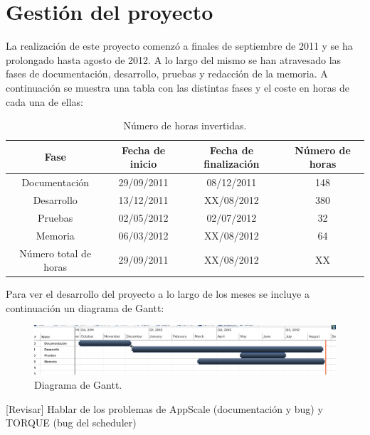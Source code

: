 \chapter{Gestión del proyecto}
\label{anx:gestion}


La realización de este proyecto comenzó a finales de septiembre de 2011 y se ha prolongado hasta agosto de 2012. A lo largo del mismo se han atravesado las fases de documentación, desarrollo, pruebas y redacción de la memoria. A continuación se muestra una tabla con las distintas fases y el coste en horas de cada una de ellas:

\begin{table}[!htbp]
\centering
   \begin{tabular}{|c|c|c|c|}
      \hline
      \textbf{Fase} & \textbf{Fecha de inicio} & \textbf{Fecha de finalización} & \textbf{Número de horas} \\ \hline
      Documentación & 29/09/2011 & 08/12/2011 & 148 \\ \hline
      Desarrollo & 13/12/2011 & XX/08/2012 & 380 \\ \hline
      Pruebas & 02/05/2012 & 02/07/2012 & 32 \\ \hline
      Memoria & 06/03/2012 & XX/08/2012 & 64 \\ \hline
      \hline
      Número total de horas & 29/09/2011 & XX/08/2012 & XX \\ \hline
   \end{tabular}
\caption{Número de horas invertidas.}
\label{table:horas}
\end{table}

Para ver el desarrollo del proyecto a lo largo de los meses se incluye a continuación un diagrama de Gantt:

\begin{figure} [!htbp]
  \centering
  \includegraphics[width=13.5cm]{imagenes/gantt.png}
  \caption{Diagrama de Gantt.}
\label{figure:gantt}
\end{figure}

[Revisar] Hablar de los problemas de AppScale (documentación y bug) y TORQUE (bug del scheduler)
